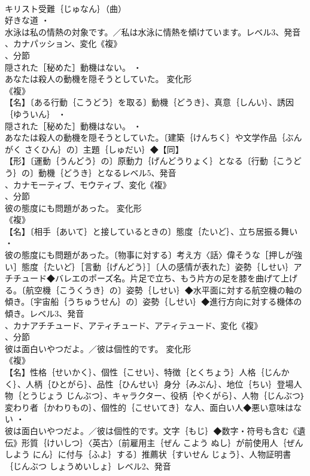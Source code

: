 \documentclass[8pt]{extreport}
\begin{document}
\begin{CJK}{UTF8}{min}
\\	キリスト受難｛じゅなん｝（曲）
\\	好きな道 ・
\\	水泳は私の情熱の対象です。／私は水泳に情熱を傾けています。レベル3、発音
\\	、カナパッション、変化《複》
\\	、分節
\\	隠された［秘めた］動機はない。 ・
\\	あなたは殺人の動機を隠そうとしていた。	変化形 
\\	《複》
\\	【名】〔ある行動｛こうどう｝を取る〕動機｛どうき｝、真意｛しんい｝、誘因｛ゆういん｝ ・
\\	隠された［秘めた］動機はない。 ・
\\	あなたは殺人の動機を隠そうとしていた。〔建築｛けんちく｝や文学作品｛ぶんがく さくひん｝の〕主題｛しゅだい｝◆【同】
\\	【形】〔運動｛うんどう｝の〕原動力｛げんどうりょく｝となる〔行動｛こうどう｝の〕動機｛どうき｝となるレベル5、発音
\\	、カナモーティブ、モウティブ、変化《複》
\\	、分節
\\	彼の態度にも問題があった。	変化形 
\\	《複》
\\	【名】〔相手｛あいて｝と接しているときの〕態度｛たいど｝、立ち居振る舞い ・
\\	彼の態度にも問題があった。〔物事に対する〕考え方〈話〉偉そうな［押しが強い］態度｛たいど｝［言動｛げんどう｝］〔人の感情が表れた〕姿勢｛しせい｝アチチュード◆バレエのポーズ名。片足で立ち、もう片方の足を膝を曲げて上げる。〔航空機｛こうくうき｝の〕姿勢｛しせい｝◆水平面に対する航空機の軸の傾き。〔宇宙船｛うちゅうせん｝の〕姿勢｛しせい｝◆進行方向に対する機体の傾き。レベル3、発音
\\	、カナアチチュード、アティチュード、アティテュード、変化《複》
\\	、分節
\\	彼は面白いやつだよ。／彼は個性的です。	変化形 
\\	《複》
\\	【名】性格｛せいかく｝、個性｛こせい｝、特徴｛とくちょう｝人格｛じんかく｝、人柄｛ひとがら｝、品性｛ひんせい｝身分｛みぶん｝、地位｛ちい｝登場人物｛とうじょう じんぶつ｝、キャラクター、役柄｛やくがら｝、人物｛じんぶつ｝変わり者｛かわりもの｝、個性的｛こせいてき｝な人、面白い人◆悪い意味はない ・
\\	彼は面白いやつだよ。／彼は個性的です。文字｛もじ｝◆数字・符号も含む《遺伝》形質｛けいしつ｝〈英古〉〔前雇用主｛ぜん こよう ぬし｝が前使用人｛ぜん しよう にん｝に付与｛ふよ｝する〕推薦状｛すいせん じょう｝、人物証明書｛じんぶつ しょうめいしょ｝レベル2、発音

\end{CJK}
\end{document}
